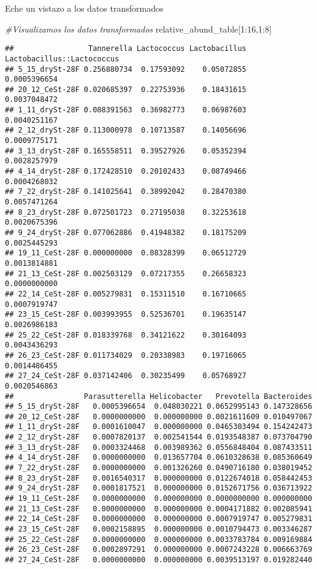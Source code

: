 \documentclass[
]{article}
\newenvironment{Shaded}{\begin{snugshade}}{\end{snugshade}}
\newcommand{\CommentTok}[1]{\textcolor[rgb]{0.56,0.35,0.01}{\textit{#1}}}
\newcommand{\DecValTok}[1]{\textcolor[rgb]{0.00,0.00,0.81}{#1}}
\newcommand{\NormalTok}[1]{#1}
\newcommand{\SpecialCharTok}[1]{\textcolor[rgb]{0.00,0.00,0.00}{#1}}
\begin{document}
Eche un vistazo a los datos transformados

\begin{Shaded}
\begin{Highlighting}[]
\CommentTok{\#Visualizamos los datos transformados}
\NormalTok{relative\_abund\_table[}\DecValTok{1}\SpecialCharTok{:}\DecValTok{16}\NormalTok{,}\DecValTok{1}\SpecialCharTok{:}\DecValTok{8}\NormalTok{]}
\end{Highlighting}
\end{Shaded}

\begin{verbatim}
##                 Tannerella Lactococcus Lactobacillus Lactobacillus::Lactococcus
## 5_15_drySt-28F 0.256880734  0.17593092    0.05072855               0.0005396654
## 20_12_CeSt-28F 0.020685397  0.22753936    0.18431615               0.0037048472
## 1_11_drySt-28F 0.088391563  0.36982773    0.06987603               0.0040251167
## 2_12_drySt-28F 0.113000978  0.10713587    0.14056696               0.0009775171
## 3_13_drySt-28F 0.165558511  0.39527926    0.05352394               0.0028257979
## 4_14_drySt-28F 0.172428510  0.20102433    0.08749466               0.0004268032
## 7_22_drySt-28F 0.141025641  0.38992042    0.28470380               0.0057471264
## 8_23_drySt-28F 0.072501723  0.27195038    0.32253618               0.0020675396
## 9_24_drySt-28F 0.077062886  0.41948382    0.18175209               0.0025445293
## 19_11_CeSt-28F 0.000000000  0.08328399    0.06512729               0.0013814881
## 21_13_CeSt-28F 0.002503129  0.07217355    0.26658323               0.0000000000
## 22_14_CeSt-28F 0.005279831  0.15311510    0.16710665               0.0007919747
## 23_15_CeSt-28F 0.003993955  0.52536701    0.19635147               0.0026986183
## 25_22_CeSt-28F 0.018339768  0.34121622    0.30164093               0.0043436293
## 26_23_CeSt-28F 0.011734029  0.20338983    0.19716065               0.0014486455
## 27_24_CeSt-28F 0.037142406  0.30235499    0.05768927               0.0020546863
##                Parasutterella Helicobacter   Prevotella Bacteroides
## 5_15_drySt-28F   0.0005396654  0.048030221 0.0652995143 0.147328656
## 20_12_CeSt-28F   0.0000000000  0.000000000 0.0021611609 0.010497067
## 1_11_drySt-28F   0.0001610047  0.000000000 0.0465303494 0.154242473
## 2_12_drySt-28F   0.0007820137  0.002541544 0.0193548387 0.073704790
## 3_13_drySt-28F   0.0003324468  0.003989362 0.0556848404 0.087433511
## 4_14_drySt-28F   0.0000000000  0.013657704 0.0610328638 0.085360649
## 7_22_drySt-28F   0.0000000000  0.001326260 0.0490716180 0.038019452
## 8_23_drySt-28F   0.0016540317  0.000000000 0.0122674018 0.058442453
## 9_24_drySt-28F   0.0001817521  0.000000000 0.0152671756 0.036713922
## 19_11_CeSt-28F   0.0000000000  0.000000000 0.0000000000 0.000000000
## 21_13_CeSt-28F   0.0000000000  0.000000000 0.0004171882 0.002085941
## 22_14_CeSt-28F   0.0000000000  0.000000000 0.0007919747 0.005279831
## 23_15_CeSt-28F   0.0002158895  0.000000000 0.0010794473 0.003346287
## 25_22_CeSt-28F   0.0000000000  0.000000000 0.0033783784 0.009169884
## 26_23_CeSt-28F   0.0002897291  0.000000000 0.0007243228 0.006663769
## 27_24_CeSt-28F   0.0000000000  0.000000000 0.0039513197 0.019282440
\end{verbatim}
\end{document}
